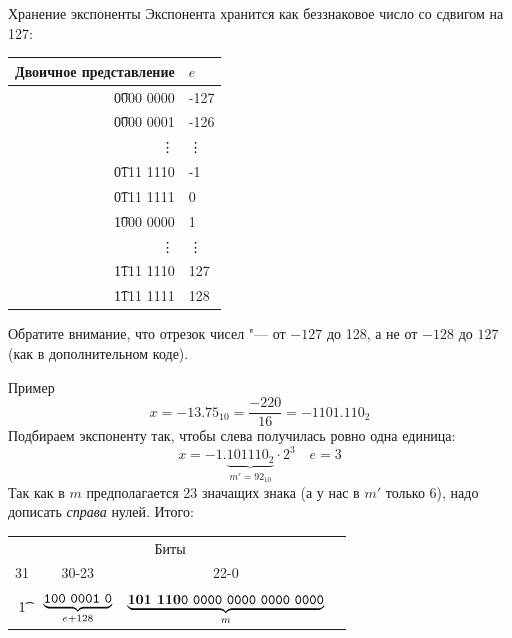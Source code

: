 \begin{frame}{Хранение экспоненты}
	Экспонента хранится как беззнаковое число со сдвигом на 127:
	\begin{center}
		\begin{tabular}{r|l}
			Двоичное представление & $e$ \\\hline
			\t{0000 0000} & -127 \\
			\t{0000 0001} & -126 \\
			\vdots & \vdots \\
			\t{0111 1110} & -1 \\
			\t{0111 1111} & 0 \\
			\t{1000 0000} & 1 \\
			\vdots & \vdots \\
			\t{1111 1110} & 127 \\
			\t{1111 1111} & 128 \\
		\end{tabular}
	\end{center}
	Обратите внимание, что отрезок чисел "--- от $-127$ до 128, а не от $-128$ до $127$ (как в дополнительном коде).
\end{frame}

\begin{frame}{Пример}
	\[
		x = -13.75_{10} = \frac{-220}{16} = -1101.110_2
	\]
	Подбираем экспоненту так, чтобы слева получилась ровно одна единица:
	\[
		x = -1.\underbrace{101110_2}_{m'=92_{10}} \cdot 2^3 \quad e=3
	\]
	Так как в $m$ предполагается 23 значащих знака (а у нас в $m'$ только 6), надо дописать \textit{справа} нулей.
	Итого:
	\begin{center}
		\begin{tabular}{c|c|c|c}
			\multicolumn{3}{c}{Биты} \\
			31 & 30-23 & 22-0 \\\hline
			\t{1} & $\underbrace{\t{100~0001~0}}_{e+128}$ & $\underbrace{\t{\textbf{101~110}0~0000~0000~0000~0000}}_{m}$ \\
		\end{tabular}
	\end{center}	
\end{frame}

